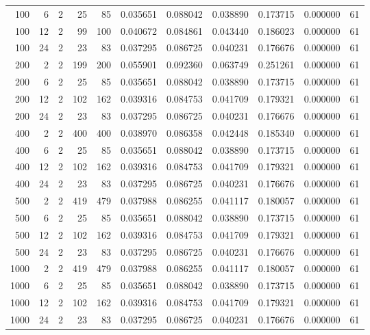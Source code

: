 \begin{table}
\begin{tabular}{rrrrrrrrrrr}
100 & 6 & 2 & 25 & 85 & 0.035651 & 0.088042 & 0.038890 & 0.173715 & 0.000000 & 61 \\
100 & 12 & 2 & 99 & 100 & 0.040672 & 0.084861 & 0.043440 & 0.186023 & 0.000000 & 61 \\
100 & 24 & 2 & 23 & 83 & 0.037295 & 0.086725 & 0.040231 & 0.176676 & 0.000000 & 61 \\
200 & 2 & 2 & 199 & 200 & 0.055901 & 0.092360 & 0.063749 & 0.251261 & 0.000000 & 61 \\
200 & 6 & 2 & 25 & 85 & 0.035651 & 0.088042 & 0.038890 & 0.173715 & 0.000000 & 61 \\
200 & 12 & 2 & 102 & 162 & 0.039316 & 0.084753 & 0.041709 & 0.179321 & 0.000000 & 61 \\
200 & 24 & 2 & 23 & 83 & 0.037295 & 0.086725 & 0.040231 & 0.176676 & 0.000000 & 61 \\
400 & 2 & 2 & 400 & 400 & 0.038970 & 0.086358 & 0.042448 & 0.185340 & 0.000000 & 61 \\
400 & 6 & 2 & 25 & 85 & 0.035651 & 0.088042 & 0.038890 & 0.173715 & 0.000000 & 61 \\
400 & 12 & 2 & 102 & 162 & 0.039316 & 0.084753 & 0.041709 & 0.179321 & 0.000000 & 61 \\
400 & 24 & 2 & 23 & 83 & 0.037295 & 0.086725 & 0.040231 & 0.176676 & 0.000000 & 61 \\
500 & 2 & 2 & 419 & 479 & 0.037988 & 0.086255 & 0.041117 & 0.180057 & 0.000000 & 61 \\
500 & 6 & 2 & 25 & 85 & 0.035651 & 0.088042 & 0.038890 & 0.173715 & 0.000000 & 61 \\
500 & 12 & 2 & 102 & 162 & 0.039316 & 0.084753 & 0.041709 & 0.179321 & 0.000000 & 61 \\
500 & 24 & 2 & 23 & 83 & 0.037295 & 0.086725 & 0.040231 & 0.176676 & 0.000000 & 61 \\
1000 & 2 & 2 & 419 & 479 & 0.037988 & 0.086255 & 0.041117 & 0.180057 & 0.000000 & 61 \\
1000 & 6 & 2 & 25 & 85 & 0.035651 & 0.088042 & 0.038890 & 0.173715 & 0.000000 & 61 \\
1000 & 12 & 2 & 102 & 162 & 0.039316 & 0.084753 & 0.041709 & 0.179321 & 0.000000 & 61 \\
1000 & 24 & 2 & 23 & 83 & 0.037295 & 0.086725 & 0.040231 & 0.176676 & 0.000000 & 61 \\
\bottomrule
\end{tabular}
\end{table}

